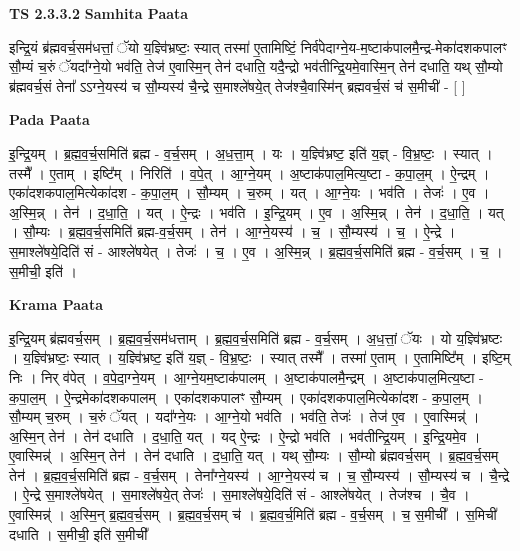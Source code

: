 \documentclass[17pt]{extarticle}
\begin{document}
\textbf{TS 2.3.3.2 } \newline
\textbf{Samhita Paata} \newline

इन्द्रि॒यं ब्र॑ह्मवर्च॒सम॑धत्तां॒ ॅयो य॒ज्ञ्वि॑भ्रष्टः॒ स्यात् तस्मा॑ ए॒तामिष्टिं॒ निर्व॑पेदाग्ने॒य-म॒ष्टाक॑पालमै॒न्द्र-मेका॑दशकपालꣳ सौ॒म्यं च॒रुं ॅयदा᳚ग्ने॒यो भव॑ति॒ तेज॑ ए॒वास्मि॒न् तेन॑ दधाति॒ यदै॒न्द्रो भव॑तीन्द्रि॒यमे॒वास्मि॒न् तेन॑ दधाति॒ यथ् सौ॒म्यो ब्र॑ह्मवर्च॒सं तेना᳚ ऽऽग्ने॒यस्य॑ च सौ॒म्यस्य॑ चै॒न्द्रे स॒माश्ले॑षये॒त् तेज॑श्चै॒वास्मि॑न् ब्रह्मवर्च॒सं च॑ स॒मीची॑ - [  ] \newline

\textbf{Pada Paata} \newline

इ॒न्द्रि॒यम् । ब्र॒ह्म॒व॒र्च॒समिति॑ ब्रह्म - व॒र्च॒सम् । अ॒ध॒त्ता॒म् । यः । य॒ज्ञ्वि॑भ्रष्ट॒ इति॑ य॒ज्ञ् - वि॒भ्र॒ष्टः॒ । स्यात् । तस्मै᳚ । ए॒ताम् । इष्टि᳚म् । निरिति॑ । व॒पे॒त् । आ॒ग्ने॒यम् । अ॒ष्टाक॑पाल॒मित्य॒ष्टा - क॒पा॒ल॒म् । ऐ॒न्द्रम् । एका॑दशकपाल॒मित्येका॑दश - क॒पा॒ल॒म् । सौ॒म्यम् । च॒रुम् । यत् । आ॒ग्ने॒यः । भव॑ति । तेजः॑ । ए॒व । अ॒स्मि॒न्न् । तेन॑ । द॒धा॒ति॒ । यत् । ऐ॒न्द्रः । भव॑ति । इ॒न्द्रि॒यम् । ए॒व । अ॒स्मि॒न्न् । तेन॑ । द॒धा॒ति॒ । यत् । सौ॒म्यः । ब्र॒ह्म॒व॒र्च॒समिति॑ ब्रह्म-व॒र्च॒सम् । तेन॑ । आ॒ग्ने॒यस्य॑ । च॒ । सौ॒म्यस्य॑ । च॒ । ऐ॒न्द्रे । स॒माश्ले॑षये॒दिति॑ सं - आश्ले॑षयेत् । तेजः॑ । च॒ । ए॒व । अ॒स्मि॒न्न् । ब्र॒ह्म॒व॒र्च॒समिति॑ ब्रह्म - व॒र्च॒सम् । च॒ । स॒मीची॒ इति॑ ।  \newline


\textbf{Krama Paata} \newline

इ॒न्द्रि॒यम् ब्र॑ह्मवर्च॒सम् । ब्र॒ह्म॒व॒र्च॒सम॑धत्ताम् । ब्र॒ह्म॒व॒र्च॒समिति॑ ब्रह्म - व॒र्च॒सम् । अ॒ध॒त्तां॒ ॅयः । यो य॒ज्ञ्वि॑भ्रष्टः । य॒ज्ञ्वि॑भ्रष्टः॒ स्यात् । य॒ज्ञ्वि॑भ्रष्ट॒ इति॑ य॒ज्ञ् - वि॒भ्र॒ष्टः॒ । स्यात् तस्मै᳚ । तस्मा॑ ए॒ताम् । ए॒तामिष्टि᳚म् । इष्टि॒म् निः । निर् व॑पेत् । व॒पे॒दा॒ग्ने॒यम् । आ॒ग्ने॒यम॒ष्टाक॑पालम् । अ॒ष्टाक॑पालमै॒न्द्रम् । अ॒ष्टाक॑पाल॒मित्य॒ष्टा - क॒पा॒ल॒म् । ऐ॒न्द्रमेका॑दशकपालम् । एका॑दशकपालꣳ सौ॒म्यम् । एका॑दशकपाल॒मित्येका॑दश - क॒पा॒ल॒म् । सौ॒म्यम् च॒रुम् । च॒रुं ॅयत् । यदा᳚ग्ने॒यः । आ॒ग्ने॒यो भव॑ति । भव॑ति॒ तेजः॑ । तेज॑ ए॒व । ए॒वास्मिन्न्॑ । अ॒स्मि॒न् तेन॑ । तेन॑ दधाति । द॒धा॒ति॒ यत् । यद् ऐ॒न्द्रः । ऐ॒न्द्रो भव॑ति । भव॑तीन्द्रि॒यम् । इ॒न्द्रि॒यमे॒व । ए॒वास्मिन्न्॑ । अ॒स्मि॒न् तेन॑ । तेन॑ दधाति । द॒धा॒ति॒ यत् । यथ् सौ॒म्यः । सौ॒म्यो ब्र॑ह्मवर्च॒सम् । ब्र॒ह्म॒व॒र्च॒सम् तेन॑ । ब्र॒ह्म॒व॒र्च॒समिति॑ ब्रह्म - व॒र्च॒सम् । तेना᳚ग्ने॒यस्य॑ । आ॒ग्ने॒यस्य॑ च । च॒ सौ॒म्यस्य॑ । सौ॒म्यस्य॑ च । चै॒न्द्रे । ऐ॒न्द्रे स॒माश्ले॑षयेत् । स॒माश्ले॑षये॒त् तेजः॑ । स॒माश्ले॑षये॒दिति॑ सं - आश्ले॑षयेत् । तेज॑श्च । चै॒व । ए॒वास्मिन्न्॑ । अ॒स्मि॒न् ब्र॒ह्म॒व॒र्च॒सम् । ब्र॒ह्म॒व॒र्च॒सम् च॑ । ब्र॒ह्म॒व॒र्च॒मिति॑ ब्रह्म - व॒र्च॒सम् । च॒ स॒मीची᳚ । स॒मिची॑ दधाति । स॒मीची॒ इति॑ स॒मीची᳚ \newline
\end{document}
